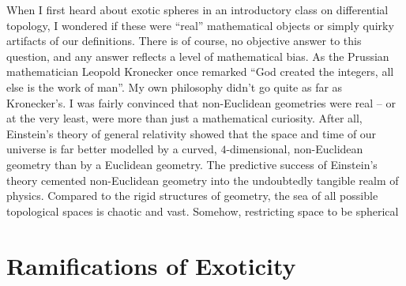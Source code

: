 When I first heard about exotic spheres in an introductory class on differential topology, I wondered if these were ``real'' mathematical objects or simply quirky artifacts of our definitions. There is of course, no objective answer to this question, and any answer reflects a level of mathematical bias.
As the Prussian mathematician Leopold Kronecker once remarked ``God created the integers, all else is the work of man''. My own philosophy didn't go quite as far as Kronecker's.
I was fairly convinced that non-Euclidean geometries were real -- or at the very least, were more than just a mathematical curiosity.
After all, Einstein's theory of general relativity showed that the space and time of our universe is far better modelled by a curved, $4$-dimensional, non-Euclidean geometry than by a Euclidean geometry.
The predictive success of Einstein's theory cemented non-Euclidean geometry into the undoubtedly tangible realm of physics.
Compared to the rigid structures of geometry, the sea of all possible topological spaces is chaotic and vast. Somehow, restricting space to be spherical 


\section*{Ramifications of Exoticity}

